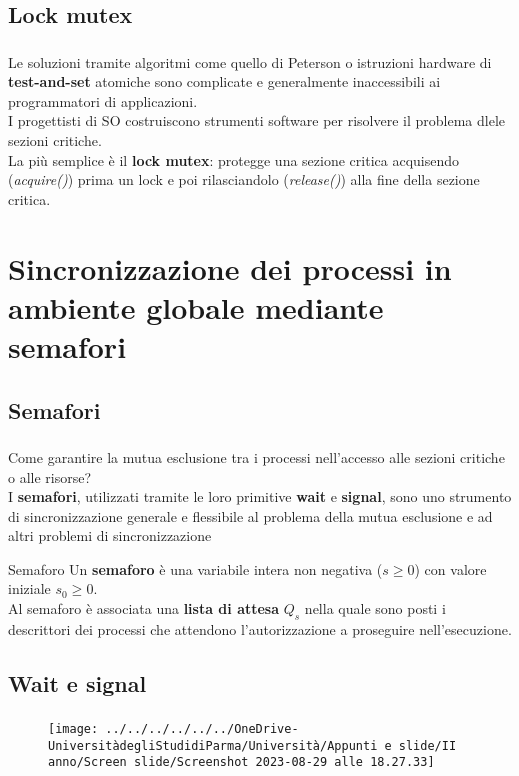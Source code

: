\documentclass{beamer}
\newenvironment{mainframe}{
	\begin{frame}
		\frametitle{\insertsubsection}
		\framesubtitle{\insertsection}
	}{
	\end{frame}
}
\begin{document}
\subsection{Lock mutex}
\begin{mainframe}
	Le soluzioni tramite algoritmi come quello di Peterson o istruzioni hardware di \textbf{test-and-set} atomiche sono complicate e generalmente inaccessibili ai programmatori di applicazioni.\\
	I progettisti di SO costruiscono strumenti software per risolvere il problema dlele sezioni critiche.\\
	La più semplice è il \textbf{lock mutex}: protegge una sezione critica acquisendo (\textit{acquire()}) prima un lock e poi rilasciandolo (\textit{release()}) alla fine della sezione critica.
\end{mainframe}
\section{Sincronizzazione dei processi in ambiente globale mediante semafori}
\subsection{Semafori}
\begin{mainframe}
	Come garantire la mutua esclusione tra i processi nell'accesso alle sezioni critiche o alle risorse?\\
	I \textbf{semafori}, utilizzati tramite le loro primitive \textbf{wait} e \textbf{signal}, sono uno strumento di sincronizzazione generale e flessibile al problema della mutua esclusione e ad altri problemi di sincronizzazione
	\begin{block}{Semaforo}
		Un \textbf{semaforo} è una variabile intera non negativa ($s \geq 0$) con valore iniziale $s_0 \geq 0$.\\
		Al semaforo è associata una \textbf{lista di attesa} $Q_s$ nella quale sono posti i descrittori dei processi che attendono l'autorizzazione a proseguire nell'esecuzione.
	\end{block}
\end{mainframe}
\subsection{Wait e signal}
\begin{mainframe}
	\begin{figure}
		\centering
		\texttt{[image: ../../../../../../OneDrive-UniversitàdegliStudidiParma/Università/Appunti e slide/II anno/Screen slide/Screenshot 2023-08-29 alle 18.27.33]}
	\end{figure}
\end{mainframe}
\end{document}
